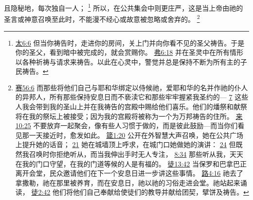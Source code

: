 \documentclass[12pt, a4paper, oneside]{ctexart}
\begin{document}
	且隐秘地，每次独自一人；
	\footnote {
		\href{https://biblehub.com/matthew/6-6.htm}{太6:6} 但当你祷告时，走进你的房间，关上门并向你看不见的圣父祷告。于是你的圣父，看到暗中被完成的，就会赏赐你。
		\href{https://biblehub.com/ephesians/6-18.htm}{弗6:18} 并在圣灵中在所有情形以各种祈祷与请求来祷告。以此在心灵中，警觉并总是保持不断为所有主的子民祷告。
	}
	所以，在公共集会中则更庄严，这是当上帝由祂的圣言或神意召唤至此时，不能漫不经心或故意被忽略或舍弃的。
	\footnote {
		\href{https://biblehub.com/isaiah/56-6.htm}{赛56:6} 而那些将他们自己与耶和华绑定以侍候祂，爱耶和华的名并作祂的仆人的异邦人，所有那些保持安息日而不亵渎它和那些牢牢握紧我圣约的---
		\href{https://biblehub.com/isaiah/56-7.htm}{7} 这些人我会带到我的圣山上并在我祷告的宫殿中赐给他们喜乐。他们的燔祭和献祭将在我的祭坛上被接受；因为我的宫殿将被称为一个为万邦祷告的住所。
		\href{https://biblehub.com/hebrews/10-25.htm}{来10:25} 不要放弃一起聚会，像有些人习惯于做的，而是彼此鼓励---而当你们看见那一天接近时，愈发如此。
		\href{https://biblehub.com/proverbs/1-20.htm}{箴1:20} 公开在外智慧大声召唤，她在公共广场上提升她的话音；
		\href{https://biblehub.com/proverbs/1-21.htm}{21} 她在城墙顶上呼求，在城门口她做她的演讲：
		\href{https://biblehub.com/proverbs/1-24.htm}{24} 但既然我召唤时你拒绝听从，而当我伸出手时无人专注，
		\href{https://biblehub.com/proverbs/8-34.htm}{8:34} 那些听从我，天天在我的门口守望，在我的门道等候的人是有福的。
		\href{https://biblehub.com/acts/13-42.htm}{徒13:42} 当保罗和巴拿巴正离开会堂，民众邀请他们在下一个安息日进一步讲这些事情。
		\href{https://biblehub.com/luke/4-16.htm}{路4:16} 祂去了拿撒勒，祂在那里被养育，而在安息日，祂以祂的习俗走进会堂。祂站起来诵读，
		\href{https://biblehub.com/acts/2-42.htm}{徒2:42} 他们将他们自己奉献给使徒们的教导并献给团契，擘饼及祷告。
	}
\end{document}
